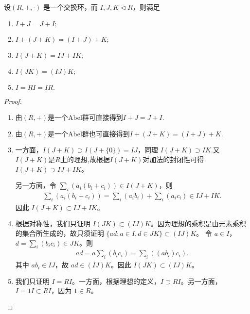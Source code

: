 \documentclass[../../main.tex]{subfiles}
\begin{document}
\begin{proposition}[理想关于加法和乘法的运算律]
设$(R, +, \cdot)$ 是一个交换环，而 $I, J, K \lhd R$，则满足
\begin{enumerate}[(1)]
\item $I + J = J + I ;$
\item $I + (J + K) = (I + J) + K ;$
\item $I(J + K) = IJ + IK;$
\item $I(JK) = (IJ)K ;$
\item $I = RI = IR .$
\end{enumerate}
\end{proposition}
\begin{proof}
\begin{enumerate}[(1)]
\item 由$(R,+)$是一个Abel群可直接得到$I + J = J + I .$

\item 由$(R,+)$是一个Abel群也可直接得到$I + (J + K) = (I + J) + K .$

\item 一方面，$I(J + K) \supset I(J + \{0\}) = IJ$，同理 $I(J + K) \supset IK$.又$I(J + K)$是$R$上的理想,故根据$I(J+K)$对加法的封闭性可得 $I(J + K) \supset IJ + IK$。

另一方面，令 $\sum_i (a_i(b_i + c_i)) \in I(J + K)$，则
\begin{align*}
\sum_i (a_i(b_i + c_i)) = \sum_i (a_ib_i) + \sum_i (a_ic_i) \in IJ + IK .
\end{align*}
因此 $I(J + K) \subset IJ + IK$。

\item 根据对称性，我们只证明 $I(JK) \subset (IJ)K$。因为理想的乘积是由元素乘积的集合所生成的，故只须证明 $\{ad : a \in I, d \in JK\} \subset (IJ)K$。
令 $a \in I$，$d = \sum_i (b_ic_i) \in JK$。则
\begin{align*}
ad = a\sum_i (b_ic_i) = \sum_i ((ab_i)c_i) .
\end{align*}
其中 $ab_i \in IJ$，故 $ad \in (IJ)K$。因此 $I(JK) \subset (IJ)K$。

\item 我们只证明 $I = RI$。一方面，根据理想的定义，$I \supset RI$。另一方面，$I = 1I \subset RI$，因为 $1 \in R$。
\end{enumerate}
\end{proof}
\end{document}
